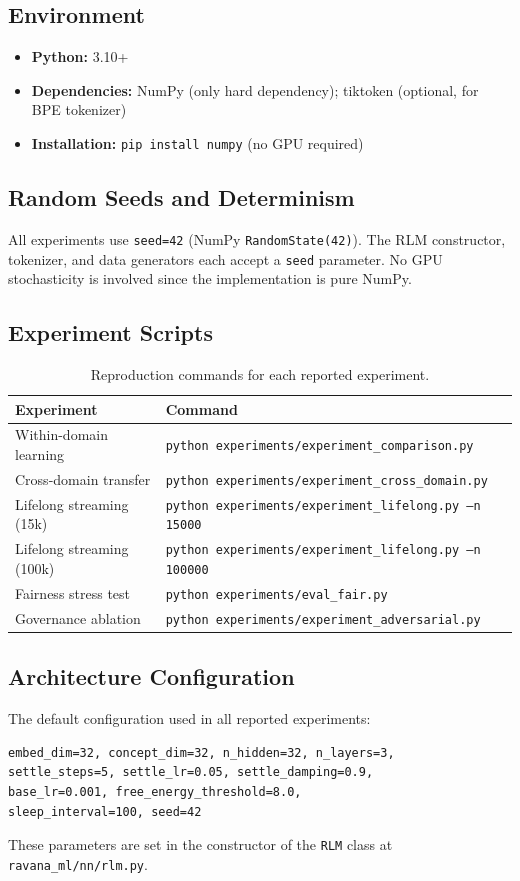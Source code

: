 \documentclass[11pt]{article}
\begin{document}
\subsection{Environment}
\begin{itemize}[leftmargin=*]
    \item \textbf{Python:} 3.10+
    \item \textbf{Dependencies:} NumPy (only hard dependency); tiktoken (optional, for BPE tokenizer)
    \item \textbf{Installation:} \texttt{pip install numpy} (no GPU required)
\end{itemize}

\subsection{Random Seeds and Determinism}
All experiments use \texttt{seed=42} (NumPy \texttt{RandomState(42)}). The RLM constructor, tokenizer, and data generators each accept a \texttt{seed} parameter. No GPU stochasticity is involved since the implementation is pure NumPy.

\subsection{Experiment Scripts}
\begin{table}[h]
\centering
\caption{Reproduction commands for each reported experiment.}
\label{tab:reproduction}
\begin{tabular}{ll}
\toprule
Experiment & Command \\
\midrule
Within-domain learning & \texttt{python experiments/experiment\_comparison.py} \\
Cross-domain transfer & \texttt{python experiments/experiment\_cross\_domain.py} \\
Lifelong streaming (15k) & \texttt{python experiments/experiment\_lifelong.py --n 15000} \\
Lifelong streaming (100k) & \texttt{python experiments/experiment\_lifelong.py --n 100000} \\
Fairness stress test & \texttt{python experiments/eval\_fair.py} \\
Governance ablation & \texttt{python experiments/experiment\_adversarial.py} \\
\bottomrule
\end{tabular}
\end{table}

\subsection{Architecture Configuration}
The default configuration used in all reported experiments:
\begin{verbatim}
embed_dim=32, concept_dim=32, n_hidden=32, n_layers=3,
settle_steps=5, settle_lr=0.05, settle_damping=0.9,
base_lr=0.001, free_energy_threshold=8.0,
sleep_interval=100, seed=42
\end{verbatim}
These parameters are set in the constructor of the \texttt{RLM} class at \texttt{ravana\_ml/nn/rlm.py}.
\end{document}
